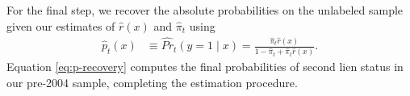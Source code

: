 \documentclass[letterpaper,12pt,usenames,dvipsnames]{article}
\theoremstyle{definition}
\begin{document}

For the final step, we recover the absolute probabilities on the unlabeled sample given our estimates of $\hat{r}(x)$ and $\hat{\pi}_t$
using
\begin{align}
	\label{eq:p-recovery}
	\hat{p}_t(x) &\equiv \widehat{Pr}_t(y = 1 \mid x) = \frac{\hat{\pi}_t \hat{r}(x)}{1 - \hat{\pi}_t + \hat{\pi}_t \hat{r}(x)}.
\end{align}
Equation \eqref{eq:p-recovery} computes the final probabilities of second lien status in our pre-2004 sample, completing the estimation procedure. 
\end{document}
